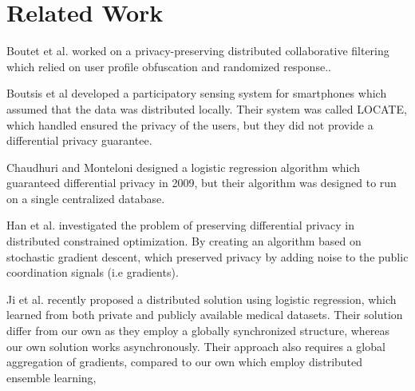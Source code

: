 
\section{Related Work}

Boutet et al. worked on a privacy-preserving distributed collaborative filtering which relied on user profile obfuscation and randomized response.\cite{boutet2013DisCollFil}.

Boutsis et al developed a participatory sensing system for smartphones which assumed that the data was distributed locally. Their system was called LOCATE, which handled ensured the privacy of the users, but they did not provide a differential privacy guarantee. \cite{boutsis2013}

Chaudhuri and Monteloni designed a logistic regression algorithm which guaranteed differential privacy in 2009, but their algorithm was designed to run on a single centralized database\cite{chaudhuri2009logistic}.

Han et al. investigated the problem of preserving differential privacy in distributed constrained optimization. By creating an algorithm based on stochastic gradient descent, which preserved privacy by adding noise to the public coordination signals (i.e gradients). \cite{han2014disOptimization}

Ji et al. \cite{ji2014DisLogReg} recently proposed a distributed solution using logistic regression, which learned from both private and publicly available medical datasets. Their solution differ from our own as they employ a globally synchronized structure, whereas our own solution works asynchronously. Their approach also requires a global aggregation of gradients, compared to our own which employ distributed ensemble learning,



